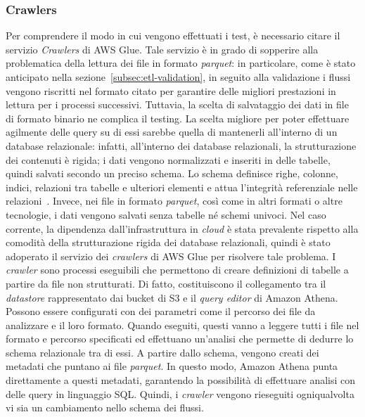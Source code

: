 \subsubsection{Crawlers}\label{subsubsec:crawlers}

Per comprendere il modo in cui vengono effettuati i test, è necessario citare il servizio \textit{Crawlers} di AWS Glue.
Tale servizio è in grado di sopperire alla problematica della lettura dei file in formato \textit{parquet}:
in particolare, come è stato anticipato nella sezione~\ref{subsec:etl-validation}, in seguito alla validazione i flussi vengono riscritti nel formato citato per garantire delle migliori prestazioni in lettura per i processi successivi.
Tuttavia, la scelta di salvataggio dei dati in file di formato binario ne complica il testing.
La scelta migliore per poter effettuare agilmente delle query su di essi sarebbe quella di mantenerli all'interno di un database relazionale:
infatti, all'interno dei database relazionali, la strutturazione dei contenuti è rigida;
i dati vengono normalizzati e inseriti in delle tabelle, quindi salvati secondo un preciso schema.
Lo schema definisce righe, colonne, indici, relazioni tra tabelle e ulteriori elementi e attua l’integrità referenziale nelle relazioni~\cite{rdbms-vantaggi}.
Invece, nei file in formato \textit{parquet}, così come in altri formati o altre tecnologie, i dati vengono salvati senza tabelle né schemi univoci.
Nel caso corrente, la dipendenza dall'infrastruttura in \textit{cloud} è stata prevalente rispetto alla comodità della strutturazione rigida dei database relazionali, quindi è stato adoperato il servizio dei \textit{crawlers} di AWS Glue per risolvere tale problema.
I \textit{crawler} sono processi eseguibili che permettono di creare definizioni di tabelle a partire da file non strutturati.
Di fatto, costituiscono il collegamento tra il \textit{datastore} rappresentato dai bucket di S3 e il \textit{query editor} di Amazon Athena.
Possono essere configurati con dei parametri come il percorso dei file da analizzare e il loro formato.
Quando eseguiti, questi vanno a leggere tutti i file nel formato e percorso specificati ed effettuano un'analisi che permette di dedurre lo schema relazionale tra di essi.
A partire dallo schema, vengono creati dei metadati che puntano ai file \textit{parquet}.
In questo modo, Amazon Athena punta direttamente a questi metadati, garantendo la possibilità di effettuare analisi con delle query in linguaggio SQL.
Quindi, i \textit{crawler} vengono rieseguiti ogniqualvolta vi sia un cambiamento nello schema dei flussi.

